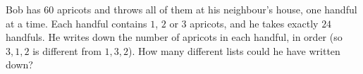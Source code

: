 Bob has $60$ apricots and throws all of them at his neighbour's house, one handful at a time. Each handful contains $1$, $2$ or $3$ apricots, and he takes exactly $24$ handfuls. He writes down the number of apricots in each handful, in order (so $3,1,2$ is different from $1,3,2$). How many different lists could he have written down?
